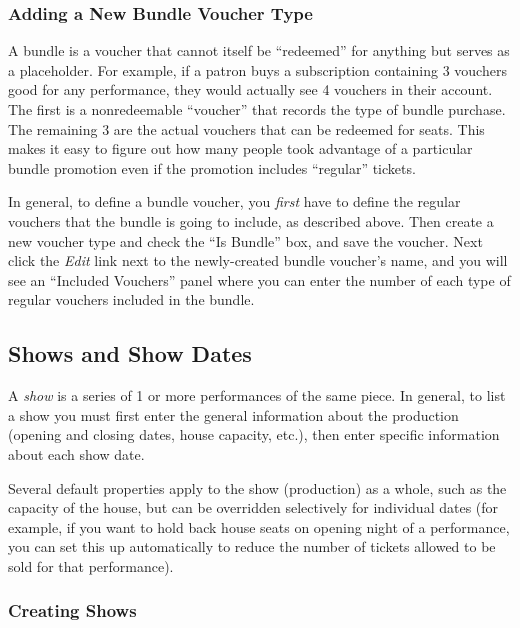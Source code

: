 \subsubsection{Adding a New Bundle Voucher Type}
\label{sec:addingbundlevouchertypes}


A bundle is a voucher that cannot itself be ``redeemed'' for anything
but serves as a placeholder.  For example, if a patron buys a
subscription containing 3 vouchers good for any performance, they would
actually see 4 vouchers in their account.  The first is a nonredeemable
``voucher'' that records the type of bundle purchase.  The remaining 3
are the actual vouchers that can be redeemed for seats.  This makes it
easy to figure out how many people took advantage of a particular
bundle promotion even if the promotion includes ``regular'' tickets.

In general, to define a bundle voucher, you \emph{first} have to define the
regular vouchers that the bundle is going to include, as described
above.   Then create a new voucher type and check the ``Is Bundle'' box,
and save the voucher.  Next click the \emph{Edit} link next to the
newly-created bundle voucher's name, and you will see an ``Included
Vouchers''  panel where you can enter the
number of each type of regular vouchers included in the bundle.

\subsection{Shows and Show Dates}
\label{sec:shows-and-showdates}

A \emph{show} is a series of 1 or more performances of the same piece.
In general, to list a show you must first enter the general information
about the production (opening and closing dates, house capacity, etc.),
then enter specific information about each show date.

Several default properties apply to the show (production) as a whole,
such as the capacity of the house, but can be overridden selectively for
individual dates (for example, if you want to hold back house seats on
opening night of a performance, you can set this up automatically to
reduce the number of tickets allowed to be sold for that performance).

\subsubsection{Creating Shows}
\label{sec:addingshows}


